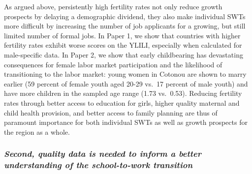 \documentclass[
  a4paper, twoside, 12pt]{book}
\begin{document}
As argued above, persistently high fertility rates not only reduce growth prospects by delaying a demographic dividend, they also make individual SWTs more difficult by increasing the number of job applicants for a growing, but still limited number of formal jobs. In Paper 1, we show that countries with higher fertility rates exhibit worse scores on the YLILI, especially when calculated for male-specific data. In Paper 2, we show that early childbearing has devastating consequences for female labor market participation and the likelihood of transitioning to the labor market: young women in Cotonou are shown to marry earlier (59 percent of female youth aged 20-29 vs.~17 percent of male youth) and have more children in the sampled age range (1.73 vs.~0.53). Reducing fertility rates through better access to education for girls, higher quality maternal and child health provision, and better access to family planning are thus of paramount importance for both individual SWTs as well as growth prospects for the region as a whole.

\hypertarget{second-quality-data-is-needed-to-inform-a-better-understanding-of-the-school-to-work-transition}{%
\subsubsection*{\texorpdfstring{\emph{Second, quality data is needed to inform a better understanding of the school-to-work transition}}{Second, quality data is needed to inform a better understanding of the school-to-work transition}}\label{second-quality-data-is-needed-to-inform-a-better-understanding-of-the-school-to-work-transition}}
\end{document}
